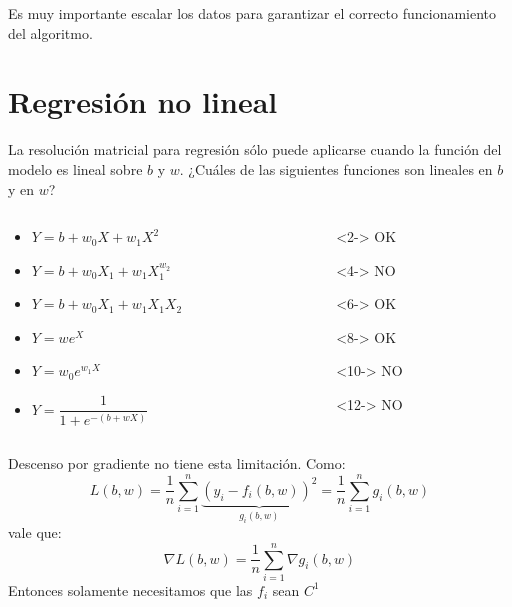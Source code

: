 \documentclass[aspectratio=169, usenames,dvipsnames]{beamer}
\begin{document}
\begin{frame}
    \Large\alert{Es muy importante escalar los datos para garantizar el correcto funcionamiento del algoritmo.}
\end{frame}

\section{Regresión no lineal}

\begin{frame}
    La resolución matricial para regresión sólo puede aplicarse cuando la función del modelo es lineal sobre $b$ y $w$. ¿Cuáles de las siguientes funciones son lineales en $b$ y en $w$?
    \begin{columns}
    \begin{column}{0.35\textwidth}
    \begin{itemize}
        \item<1-> $Y = b + w_0X + w_1 X^2$ 
        \item<3-> $Y = b + w_0X_1 + w_1X_1^{w_2}$
        \item<5-> $Y = b + w_0X_1 + w_1X_1X_2$
        \item<7-> $Y = we^X$
        \item<9-> $Y = w_0e^{w_1X}$
        \item<11-> $Y = \dfrac{1}{1 + e^{-(b + wX)}}$
    \end{itemize}
    \end{column}
    \begin{column}{0.65\textwidth}
    \begin{itemize}
        \item[]<2-> {\color{green!80!blue}OK}
        \item[]<4-> {\color{red}NO}
        \item[]<6-> {\color{green!80!blue}OK}
        \item[]<8-> {\color{green!80!blue}OK}
        \item[]<10-> {\color{red}NO}
        \item[]<12-> {\color{red}NO}
        
    \end{itemize}
    \end{column}
    \end{columns}
\end{frame}

\begin{frame}
    Descenso por gradiente no tiene esta limitación. Como:
    \[L(b, w) = \dfrac{1}{n} \sum_{i=1}^n \underbrace{(y_i - f_i(b, w))^2}_{g_i(b, w)}= \dfrac{1}{n} \sum_{i=1}^n g_i(b,w)\]
    vale que:
    \[\nabla L(b, w) = \dfrac{1}{n} \sum_{i=1}^n \nabla g_i (b,w)\]
    Entonces solamente necesitamos que las $f_i$ sean $C^1$
\end{frame}
\end{document}
